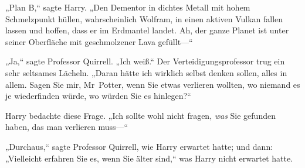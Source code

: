 „Plan B,“ sagte Harry. „Den Dementor in dichtes Metall mit hohem Schmelzpunkt hüllen, wahrscheinlich Wolfram, in einen aktiven Vulkan fallen lassen und hoffen, dass er im Erdmantel landet. Ah, der ganze Planet ist unter seiner Oberfläche mit geschmolzener Lava gefüllt—“

„Ja,“ sagte Professor Quirrell. „Ich weiß.“ Der Verteidigungsprofessor trug ein sehr seltsames Lächeln. „Daran hätte ich wirklich selbst denken sollen, alles in allem. Sagen Sie mir, Mr~Potter, wenn Sie etwas verlieren wollten, wo niemand es je wiederfinden würde, wo würden Sie es hinlegen?“

Harry bedachte diese Frage. „Ich sollte wohl nicht fragen, \emph{was} Sie gefunden haben, das man verlieren muss—“

„Durchaus,“ sagte Professor Quirrell, wie Harry erwartet hatte; und dann: „Vielleicht erfahren Sie es, wenn Sie älter sind,“ was Harry nicht erwartet hatte.

